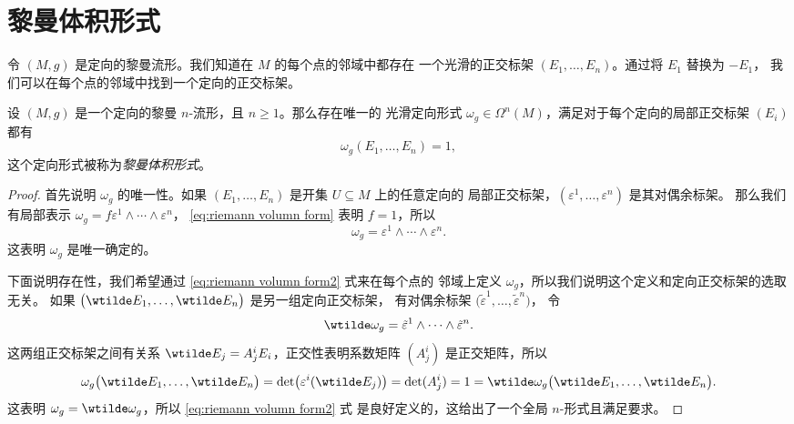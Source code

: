 \section{黎曼体积形式}

令 $(M,g)$ 是定向的黎曼流形。我们知道在 $M$ 的每个点的邻域中都存在
一个光滑的正交标架 $(E_1,\dots,E_n)$。通过将 $E_1$ 替换为 $-E_1$，
我们可以在每个点的邻域中找到一个定向的正交标架。

\begin{proposition}
  设 $(M,g)$ 是一个定向的黎曼 $n$-流形，且 $n\geq 1$。那么存在唯一的
  光滑定向形式 $\omega_g\in\Omega^n(M)$，满足对于每个定向的局部正交标架
  $(E_i)$ 都有
  \begin{equation}\label{eq:riemann volumn form}
    \omega_g(E_1,\dots,E_n)=1,
  \end{equation}
  这个定向形式被称为\emph{黎曼体积形式}。
\end{proposition}
\begin{proof}
  首先说明 $\omega_g$ 的唯一性。如果 $(E_1,\dots,E_n)$ 是开集 $U\subseteq M$ 上的任意定向的
  局部正交标架，$(\varepsilon^1,\dots,\varepsilon^n)$ 是其对偶余标架。
  那么我们有局部表示 $\omega_g=f\varepsilon^1\wedge\cdots\wedge \varepsilon^n$，
  \eqref{eq:riemann volumn form} 表明 $f=1$，所以
  \begin{equation}\label{eq:riemann volumn form2}
    \omega_g=\varepsilon^1\wedge\cdots\wedge\varepsilon^n.
  \end{equation}
  这表明 $\omega_g$ 是唯一确定的。

  下面说明存在性，我们希望通过 \eqref{eq:riemann volumn form2} 式来在每个点的
  邻域上定义 $\omega_g$，所以我们说明这个定义和定向正交标架的选取无关。
  如果 $\bigl(\wtilde E_1,\dots,\wtilde E_n\bigr)$ 是另一组定向正交标架，
  有对偶余标架 $\bigl(\tilde\varepsilon^1,\dots,\tilde\varepsilon^n\bigr)$，
  令
  \[
    \wtilde\omega_g=\tilde\varepsilon^1\wedge\cdots\wedge \tilde\varepsilon^n.
  \]
  这两组正交标架之间有关系 $\wtilde E_j=A_j^iE_i$，正交性表明系数矩阵
  $(A_j^i)$ 是正交矩阵，所以
  \[
    \omega_g\bigl(\wtilde E_1,\dots,\wtilde E_n\bigr)
    =\det\bigl(\varepsilon^i(\wtilde E_j)\bigr)=
    \det(A_j^i)=1=\wtilde\omega_g\bigl(
      \wtilde E_1,\dots,\wtilde E_n
    \bigr).
  \]
  这表明 $\omega_g=\wtilde\omega_g$，所以 \eqref{eq:riemann volumn form2} 式
  是良好定义的，这给出了一个全局 $n$-形式且满足要求。
\end{proof}

